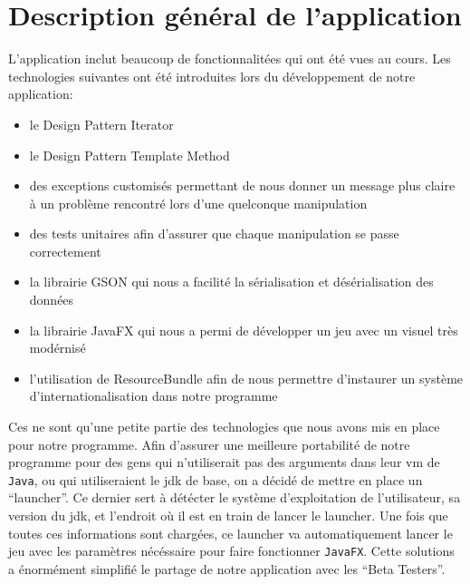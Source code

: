 \section{Description général de l'application}
L'application inclut beaucoup de fonctionnalitées qui ont été vues au cours.
Les technologies suivantes ont été introduites lors du développement de notre application:
\begin{itemize}
\item le Design Pattern Iterator
\item le Design Pattern Template Method
\item des exceptions customisés permettant de nous donner un message plus claire à un problème rencontré lors d'une quelconque manipulation
\item des tests unitaires afin d'assurer que chaque manipulation se passe correctement
\item la librairie GSON qui nous a facilité la sérialisation et désérialisation des données
\item la librairie JavaFX qui nous a permi de développer un jeu avec un visuel très modérnisé
\item l'utilisation de ResourceBundle afin de nous permettre d'instaurer un système d'internationalisation dans notre programme
\end{itemize}
Ces ne sont qu'une petite partie des technologies que nous avons mis en place pour notre programme.
Afin d'assurer une meilleure portabilité de notre programme pour des gens qui n'utiliserait pas des arguments dans leur \acrshort{vm} de \verb|Java|, ou qui utiliseraient le \acrshort{jdk} de base, on a décidé de mettre en place un \enquote{launcher}.
Ce dernier sert à détécter le système d'exploitation de l'utilisateur, sa version du \acrshort{jdk}, et l'endroit où il est en train de lancer le launcher.
Une fois que toutes ces informations sont chargées, ce launcher va automatiquement lancer le jeu avec les paramètres nécéssaire pour faire fonctionner \verb|JavaFX|.
Cette solutions a énormément simplifié le partage de notre application avec les \enquote{Beta Testers}.

